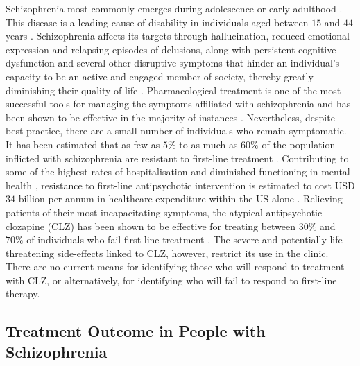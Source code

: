 Schizophrenia most commonly emerges during adolescence or early adulthood \citep{spitzer1980diagnostic}. This disease is a leading cause of disability in individuals aged between $15$ and $44$ years \citep{rossler2005size}. Schizophrenia affects its targets through hallucination, reduced emotional expression and relapsing episodes of delusions, along with persistent cognitive dysfunction and several other disruptive symptoms that hinder an individual’s capacity to be an active and engaged member of society, thereby greatly diminishing their quality of life \citep{spitzer1980diagnostic}. Pharmacological treatment is one of the most successful tools for managing the symptoms affiliated with schizophrenia and has been shown to be effective in the majority of instances \citep{matheson2014much}. Nevertheless, despite best-practice, there are a small number of individuals who remain symptomatic. It has been estimated that as few as $5\%$ to as much as $60\%$ of the population inflicted with schizophrenia are resistant to first-line treatment \citep{elkis2007treatment, lehman2004practice, essock1996clozapine, juarez1995effects}. Contributing to some of the highest rates of hospitalisation and diminished functioning in mental health \citep{iasevoli2016treatment, lieberman2012comprehensive}, resistance to first-line antipsychotic intervention is estimated to cost USD $34$ billion per annum in healthcare expenditure within the US alone \citep{kennedy2014social}. Relieving patients of their most incapacitating symptoms, the atypical antipsychotic clozapine (CLZ) has been shown to be effective for treating between $30\%$ and $70\%$ of individuals who fail first-line treatment \citep{elkis2007treatment, essali2009clozapine, kane2016role}. The severe and potentially life-threatening side-effects linked to CLZ, however, restrict its use in the clinic. There are no current means for identifying those who will respond to treatment with CLZ, or alternatively, for identifying who will fail to respond to first-line therapy.

\subsection{Treatment Outcome in People with Schizophrenia}

